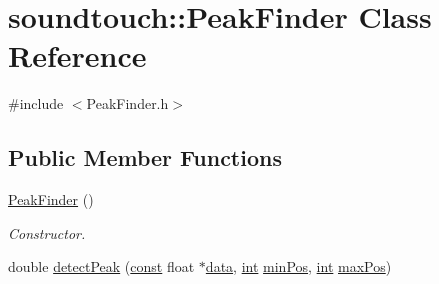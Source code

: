 \hypertarget{classsoundtouch_1_1_peak_finder}{}\section{soundtouch\+:\+:Peak\+Finder Class Reference}
\label{classsoundtouch_1_1_peak_finder}


{\ttfamily \#include $<$Peak\+Finder.\+h$>$}

\subsection*{Public Member Functions}
\begin{DoxyCompactItemize}
\item 
\hyperlink{classsoundtouch_1_1_peak_finder_a898d18a5b6c84326569ce627c289d257}{Peak\+Finder} ()
\begin{DoxyCompactList}\small\item\em Constructor. \end{DoxyCompactList}\item 
double \hyperlink{classsoundtouch_1_1_peak_finder_adc34496662588bf6089c46ff666b0b2e}{detect\+Peak} (\hyperlink{getopt1_8c_a2c212835823e3c54a8ab6d95c652660e}{const} float $\ast$\hyperlink{lib_2expat_8h_ac39e72a1de1cb50dbdc54b08d0432a24}{data},   \hyperlink{xmltok_8h_a5a0d4a5641ce434f1d23533f2b2e6653}{int} \hyperlink{classsoundtouch_1_1_peak_finder_af0e19e7db5bf28173e0625b730d8e86d}{min\+Pos}, \hyperlink{xmltok_8h_a5a0d4a5641ce434f1d23533f2b2e6653}{int} \hyperlink{classsoundtouch_1_1_peak_finder_aa4f066ba70f6cc344575b22a3792fb4c}{max\+Pos})
\end{DoxyCompactItemize}
